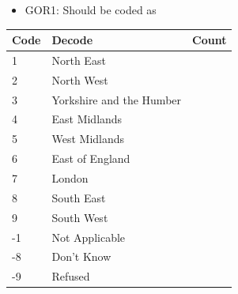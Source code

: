 \documentclass[
  11pt,
]{article}
\providecommand{\tightlist}{%
  \setlength{\itemsep}{0pt}\setlength{\parskip}{0pt}}
\begin{document}
\begin{itemize}
\tightlist
\item
  GOR1: Should be coded as
\end{itemize}

\begin{longtable}[]{@{}lll@{}}
\toprule()
Code & Decode & Count \\
\midrule()
\endhead
1 & North East & \\
2 & North West & \\
3 & Yorkshire and the Humber & \\
4 & East Midlands & \\
5 & West Midlands & \\
6 & East of England & \\
7 & London & \\
8 & South East & \\
9 & South West & \\
-1 & Not Applicable & \\
-8 & Don't Know & \\
-9 & Refused & \\
\bottomrule()
\end{longtable}
\end{document}
